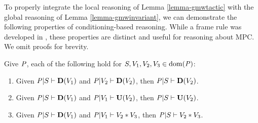 To properly integrate the local reasoning of Lemma \ref{lemma-gmwtactic} with
the global reasoning of Lemma \ref{lemma-gmwinvariant}, we can demonstrate
the following properties of conditioning-based reasoning. While a frame rule
was developed in \cite{li2023lilac}, these properties are distinct and
useful for reasoning about MPC. We omit proofs for brevity. 
\begin{lemma}
  \label{lemma-conditioning}
  Give $\mathit{P}$, each of the following hold for $S,V_1,V_2,V_3 \in \mathrm{dom}(\mathit{P})$:
  \begin{enumerate}
    \item Given $\mathit{P}|S \vdash \mathbf{D}(V_1)$ and
      $\mathit{P}|V_2 \vdash \mathbf{D}(V_2)$, then $\mathit{P}|S \vdash \mathbf{D}(V_2)$.
    \item Given $\mathit{P}|S \vdash \mathbf{D}(V_1)$ and
      $\mathit{P}|V_1 \vdash \mathbf{U}(V_2)$, then $\mathit{P}|S \vdash \mathbf{U}(V_2)$.
    \item Given $\mathit{P}|S \vdash \mathbf{D}(V_1)$ and
      $\mathit{P}|V_1 \vdash V_2 * V_3$, then $\mathit{P}|S \vdash V_2 * V_3$.
  \end{enumerate}
\end{lemma}

